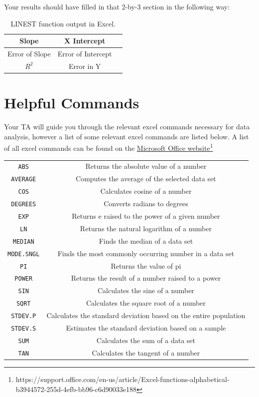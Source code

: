 \documentclass[letterpaper, 12pt]{book}
\begin{document}
Your results should have filled in that 2-by-3 section in the following way:
\begin {table}[H]
\begin{center}
\begin{tabular}{ |c | c | c |}
\hline
Slope &X Intercept \\ \hline
Error of Slope &Error of Intercept \\ \hline
$R^2$ &Error in Y \\ \hline
\end{tabular}
\caption{LINEST function output in Excel.}
\end{center}
\end{table}

\section{Helpful Commands}

Your TA will guide you through the relevant excel commands necessary for data analysis, however a list of some relevant excel commands are listed below. A list of all excel commands can be found on the \href{https://support.office.com/en-us/article/Excel-functions-alphabetical-b3944572-255d-4efb-bb96-c6d90033e188}{Microsoft Office website}\footnote{https://support.office.com/en-us/article/Excel-functions-alphabetical-b3944572-255d-4efb-bb96-c6d90033e188}

\begin{center}
\begin{tabular}{c | c}
\texttt{ABS} & Returns the absolute value of a number \\
\texttt{AVERAGE} & Computes the average of the selected data set \\
\texttt{COS} & Calculates cosine of a number\\
\texttt{DEGREES} & Converts radians to degrees \\
\texttt{EXP} & Returns e raised to the power of a given number \\
\texttt{LN} & Returns the natural logarithm of a number \\
\texttt{MEDIAN} & Finds the median of a data set \\
\texttt{MODE.SNGL} & Finds the most commonly occurring number in a data set\\
\texttt{PI} & Returns the value of pi\\
\texttt{POWER} & Returns the result of a number raised to a power\\
\texttt{SIN} & Calculates the sine of a number\\
\texttt{SQRT} & Calculates the square root of a number\\
\texttt{STDEV.P} & Calculates the standard deviation based on the entire population \\
\texttt{STDEV.S} & Estimates the standard deviation based on a sample \\
\texttt{SUM} & Calculates the sum of a data set\\
\texttt{TAN} & Calculates the tangent of a number
\end{tabular}
\end{center}
\end{document}
